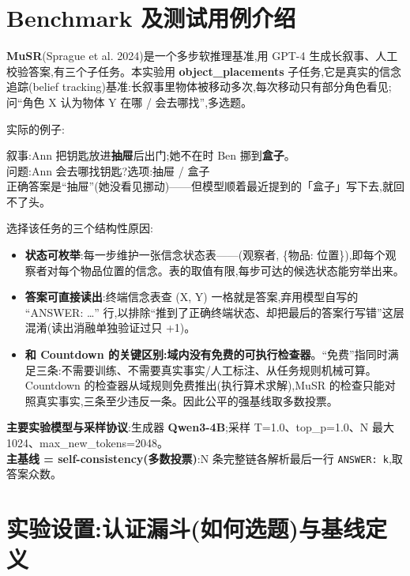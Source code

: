 \documentclass[fontset=none,10.5pt]{ctexart}
\begin{document}
\section{Benchmark 及测试用例介绍}

\textbf{MuSR}(Sprague et al. 2024)是一个多步软推理基准,用 GPT-4 生成长叙事、人工校验答案,有三个子任务。本实验用 \textbf{object\_placements} 子任务,它是真实的信念追踪(belief tracking)基准:长叙事里物体被移动多次,每次移动只有部分角色看见;问``角色 X 认为物体 Y 在哪 / 会去哪找'',多选题。

实际的例子:

\begin{notice}
叙事:Ann 把钥匙放进\textbf{抽屉}后出门;她不在时 Ben 挪到\textbf{盒子}。\\
问题:Ann 会去哪找钥匙?\quad 选项:抽屉 / 盒子\\
正确答案是``抽屉''(她没看见挪动)——但模型顺着最近提到的「盒子」写下去,就回不了头。
\end{notice}

选择该任务的三个结构性原因:

\begin{itemize}
\item \textbf{状态可枚举}:每一步维护一张信念状态表——(观察者, \{物品: 位置\}),即每个观察者对每个物品位置的信念。表的取值有限,每步可达的候选状态能穷举出来。
\item \textbf{答案可直接读出}:终端信念表查 (X, Y) 一格就是答案,弃用模型自写的 ``ANSWER: \ldots'' 行,以排除``推到了正确终端状态、却把最后的答案行写错''这层混淆(读出消融单独验证过只 +1)。
\item \textbf{和 Countdown 的关键区别:域内没有免费的可执行检查器}。``免费''指同时满足三条:不需要训练、不需要真实事实/人工标注、从任务规则机械可算。Countdown 的检查器从域规则免费推出(执行算术求解),MuSR 的检查只能对照真实事实,三条至少违反一条。因此公平的强基线取多数投票。
\end{itemize}

{\sloppy
\textbf{主要实验模型与采样协议}:生成器 \textbf{Qwen3-4B};采样 T=1.0、top\_p=1.0、N 最大 1024、max\_new\_tokens=2048。\\
\textbf{主基线 = self-consistency(多数投票)}:N 条完整链各解析最后一行 \texttt{ANSWER: k},取答案众数。\par}

\section{实验设置:认证漏斗(如何选题)与基线定义}
\end{document}
